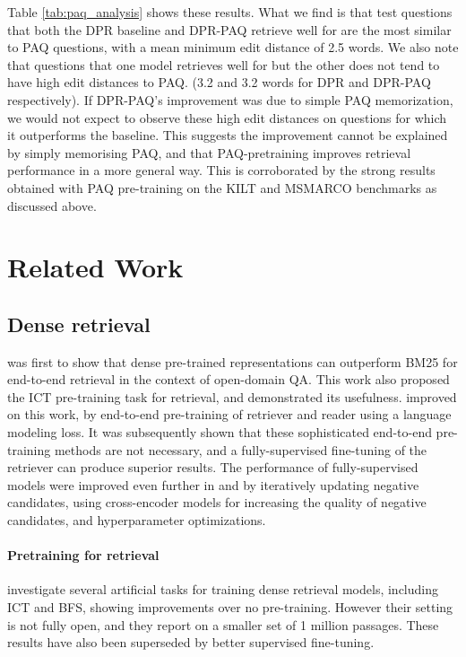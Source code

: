\documentclass[11pt]{article}
\begin{document}
Table \ref{tab:paq_analysis} shows these results.
What we find is that test questions that both the DPR baseline and DPR-PAQ  retrieve well for are the most similar to PAQ questions, with a mean minimum edit distance of 2.5 words.
We also note that questions that one model retrieves well for but the other does not tend to have high edit distances to PAQ. (3.2 and 3.2 words for DPR and DPR-PAQ respectively).
If DPR-PAQ's improvement was due to simple PAQ memorization, we would not expect to observe these high edit distances on questions for which it outperforms the baseline.
This suggests the improvement cannot be explained by simply memorising PAQ, and that PAQ-pretraining improves retrieval performance in a more general way.  This is corroborated by the strong results obtained with PAQ pre-training on the KILT and MSMARCO benchmarks as discussed above.


 
\section{Related Work}

\subsection{Dense retrieval}
\citet{orqa} was first to show that dense pre-trained representations can outperform BM25 for end-to-end retrieval in the context of open-domain QA.  This work also proposed the ICT pre-training task for retrieval, and demonstrated its usefulness.  \citet{REALM} improved on this work, by end-to-end pre-training of retriever and reader using a language modeling loss.  It was subsequently shown \citep{dpr} that these sophisticated end-to-end pre-training methods are not necessary, and a fully-supervised fine-tuning of the retriever can produce superior results.  The performance of fully-supervised models were improved even further in \citep{xiong2020approximate} and \citep{qu2021rocketqa} by iteratively updating negative candidates, using cross-encoder models for increasing the quality of negative candidates, and hyperparameter optimizations.
\paragraph{Pretraining for retrieval}
\citet{chang2020pre} investigate several artificial tasks for training dense retrieval models, including ICT and BFS, showing improvements over no pre-training.  However their setting is not fully open, and they report on a smaller set of 1 million passages.  These results have also been superseded by better supervised fine-tuning.  
\end{document}
